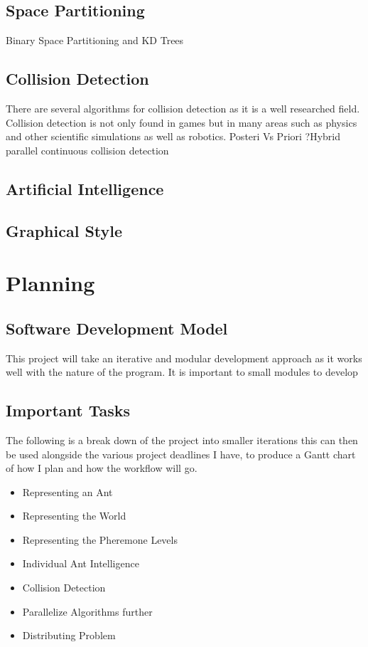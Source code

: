 \documentclass{report}
\begin{document}
\section {Space Partitioning}
Binary Space Partitioning and KD Trees
\section{Collision Detection}
There are several algorithms for collision detection as it is a well researched field. Collision detection is not only found in games but in many areas such as physics and other scientific simulations as well as robotics.
Posteri Vs Priori
?Hybrid parallel continuous collision detection
\section{Artificial Intelligence} 

\section{Graphical Style}

\chapter{Planning}

\section{Software Development Model}
This project will take an iterative and modular development approach as it works well with the nature of the program. It is important to small modules to develop 

\section{Important Tasks}
The following is a break down of the project into smaller iterations this can then be used alongside the various project deadlines I have, to produce a Gantt chart of how I plan and how the workflow will go.
\begin{itemize}
	\item Representing an Ant
	\item Representing the World
	\item Representing the Pheremone Levels
	\item Individual Ant Intelligence
	\item Collision Detection
	\item Parallelize Algorithms further
	\item Distributing Problem
\end{itemize}
\end{document}
